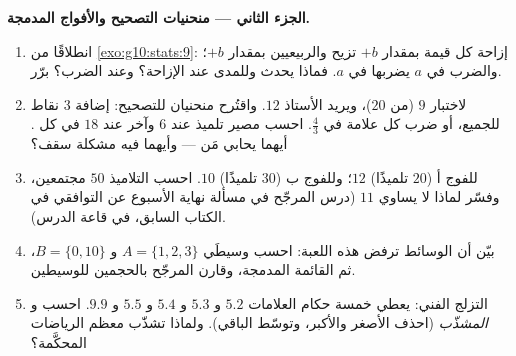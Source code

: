 \begin{problem}
\medskip
\noindent\textbf{الجزء الثاني --- منحنيات التصحيح والأفواج المدمجة.}
\begin{enumerate}[resume]
  \item انطلاقًا من \cref{exo:g10:stats:9}: إزاحة كل قيمة بمقدار
        $+b$ تزيح   والربيعيين بمقدار $+b$؛ والضرب
        في $a$ يضربها في $a$. فماذا يحدث  وللمدى
         عند الإزاحة؟ وعند الضرب؟
        برّر.
  \item لاختبار  $9$ (من $20$)، ويريد الأستاذ
         $12$. واقتُرح منحنيان للتصحيح: إضافة $3$ نقاط
        للجميع، أو ضرب كل علامة في $\frac43$. احسب
        مصير تلميذ عند $6$ وآخر عند $18$ في كل
        . أيهما يحابي مَن --- وأيهما فيه مشكلة سقف؟
  \item للفوج أ ($20$ تلميذًا)  $12$؛ وللفوج ب ($30$
        تلميذًا)  $10$. احسب  التلاميذ $50$
        مجتمعين، وفسّر لماذا لا يساوي $11$
        (درس  المرجّح في مسألة نهاية الأسبوع عن  التوافقي في الكتاب السابق، في
        قاعة الدرس).
  \item بيّن أن الوسائط ترفض هذه اللعبة: احسب وسيطَي
        $A = \{1, 2, 3\}$ و $B = \{0, 10\}$، ثم
         القائمة المدمجة، وقارن 
        المرجّح بالحجمين للوسيطين.
  \item التزلج الفني: يعطي خمسة حكام العلامات $5.2$ و $5.3$ و $5.4$ و
        $5.5$ و $9.9$. احسب   و
        \emph{ المشذّب} (احذف الأصغر والأكبر، وتوسّط
        الباقي). ولماذا تشذّب معظم الرياضات المحكَّمة؟
\end{enumerate}


\end{problem}
